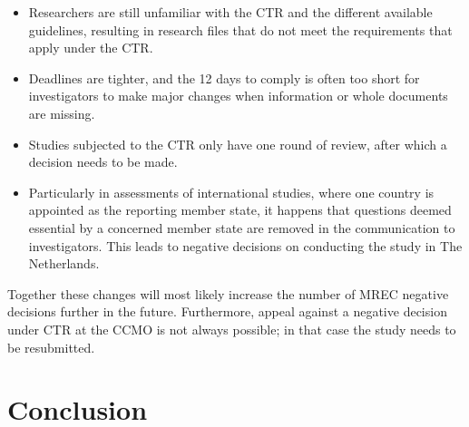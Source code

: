\documentclass[authordate, meta]{jote-new-article}
\begin{document}
\begin{itemize}


  \item Researchers are still unfamiliar with the CTR and the different available guidelines, resulting in research files that do not meet the requirements that apply under the CTR.



  \item
        Deadlines are tighter, and the 12 days to comply is often too short for investigators to make major changes when information or whole documents are missing.



  \item Studies subjected to the CTR only have one round of review, after which a decision needs to be made.



  \item
        Particularly in assessments of international studies, where one country is appointed as the reporting member state, it happens that questions deemed essential by a concerned member state are removed in the communication to investigators. This leads to negative decisions on conducting the study in The Netherlands.


\end{itemize}
\newpage
Together these changes will most likely increase the number of MREC negative decisions further in the future. Furthermore, appeal against a negative decision under CTR at the CCMO is not always possible; in that case the study needs to be resubmitted.







\section{Conclusion}
\end{document}
